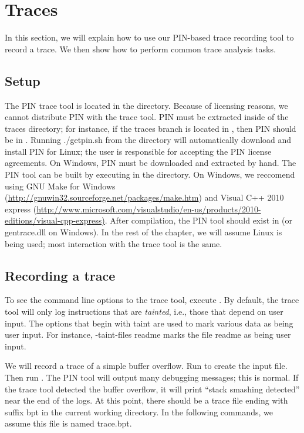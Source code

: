 \section{Traces}

In this section, we will explain how to use our PIN-based trace
recording tool to record a trace.  We then show how to perform common
trace analysis tasks.

\subsection{Setup}

The PIN trace tool is located in the 
directory.  Because of licensing reasons, we cannot distribute PIN
with the trace tool.  PIN must be extracted inside of the traces
directory; for instance, if the traces branch is located in
, then PIN should be in
.  Running ./getpin.sh from the
 directory will automatically
download and install PIN for Linux; the user is responsible for
accepting the PIN license agreements.  On Windows, PIN must be
downloaded and extracted by hand.  The PIN tool can be built by
executing  in the 
directory.  On Windows, we reccomend using GNU Make for Windows
(\url{http://gnuwin32.sourceforge.net/packages/make.htm}) and Visual
C++ 2010 express
(\url{http://www.microsoft.com/visualstudio/en-us/products/2010-editions/visual-cpp-express)}.
After compilation, the PIN tool should exist in
 (or
gentrace.dll on Windows).  In the rest of the chapter, we will assume
Linux is being used; most interaction with the trace tool is the same.

\subsection{Recording a trace}

To see the command line options to the trace tool, execute
.  By
default, the trace tool will only log instructions that are
\emph{tainted}, i.e., those that depend on user input.  The options
that begin with taint are used to mark various data
as being user input.  For instance, -taint-files readme marks the file
readme as being user input.

We will record a trace of a simple buffer overflow.  Run  to create the input file.  Then
run .  The PIN tool will output
many debugging messages; this is normal.  If the trace tool detected
the buffer overflow, it will print ``stack smashing detected'' near
the end of the logs.  At this point, there should be a trace file
ending with suffix bpt in the current working directory.  In the
following commands, we assume this file is named trace.bpt.

